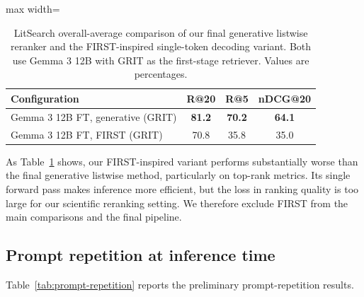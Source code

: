 \documentclass[pdflatex,sn-basic,Numbered]{sn-jnl}%
\theoremstyle{thmstyleone}%
\theoremstyle{thmstyletwo}%
\theoremstyle{thmstylethree}%
\begin{document}
\begin{table}[htbp]


\centering
\renewcommand{\arraystretch}{1.1}
\setlength{\tabcolsep}{4pt}
\footnotesize
\begin{adjustbox}{max width=\linewidth}
\begin{tabular}{l c c c}
\hline
Configuration & R@20 & R@5 & nDCG@20 \\
\hline
Gemma 3 12B FT, generative (GRIT) & \textbf{81.2} & \textbf{70.2} & \textbf{64.1} \\
Gemma 3 12B FT, FIRST (GRIT)      & 70.8 & 35.8 & 35.0 \\
\hline
\end{tabular}
\end{adjustbox}


\caption{LitSearch overall-average comparison of our final generative listwise
reranker and the FIRST-inspired single-token decoding variant. Both use Gemma 3 12B with
GRIT as the first-stage retriever. Values are percentages.}
\label{tab:first-ablation}
\end{table}

As Table~\ref{tab:first-ablation} shows, our FIRST-inspired variant performs substantially worse than
the final generative listwise method, particularly on top-rank metrics. Its single
forward pass makes inference more efficient, but the loss in ranking quality is too
large for our scientific reranking setting. We therefore exclude FIRST from the
main comparisons and the final pipeline.

\subsection{Prompt repetition at inference time}

Table~\ref{tab:prompt-repetition} reports the preliminary prompt-repetition results.
\end{document}
